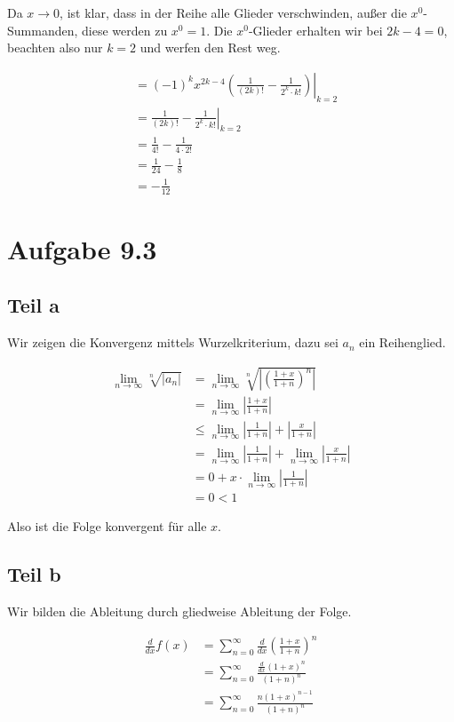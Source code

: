 \documentclass[a4paper,german,12pt,smallheadings]{scrartcl}
\begin{document}
Da $x \to 0$, ist klar, dass in der Reihe alle Glieder verschwinden, außer die
$x^0$-Summanden, diese werden zu $x^0 = 1$. Die $x^0$-Glieder erhalten wir bei
$2k-4 = 0$, beachten also nur $k=2$ und werfen den Rest weg.

\begin{align*}
   &= \left.(-1)^k x^{2k-4} \left(\frac{1}{(2k)!} - \frac{1}{2^k \cdot k!}\right)\right|_{k=2} \\
   &= \left.\frac{1}{(2k)!} - \frac{1}{2^k \cdot k!}\right|_{k=2} \\
   &= \frac{1}{4!} - \frac{1}{4\cdot 2!} \\
   &= \frac{1}{24} - \frac{1}{8} \\
   &= -\frac{1}{12}
\end{align*}

\section*{Aufgabe 9.3}
\subsection*{Teil a}

Wir zeigen die Konvergenz mittels Wurzelkriterium, dazu sei $a_n$ ein
Reihenglied.

\begin{align*}
  \lim_{n \to \infty} \sqrt[n]{|a_n|} &= \lim_{n \to \infty} \sqrt[n]{\left|\left(\frac{1+x}{1+n}\right)^n\right|} \\
  &= \lim_{n \to \infty} \left|\frac{1+x}{1+n}\right| \\
  &\le \lim_{n \to \infty} \left|\frac{1}{1+n}\right| + \left|\frac{x}{1+n}\right|\\
  &= \lim_{n \to \infty} \left|\frac{1}{1+n}\right| + \lim_{n \to \infty} \left|\frac{x}{1+n}\right|\\
  &= 0 + x \cdot \lim_{n \to \infty} \left|\frac{1}{1+n}\right|\\
  &= 0 < 1
\end{align*}

Also ist die Folge konvergent für alle $x$.

\subsection*{Teil b}
Wir bilden die Ableitung durch gliedweise Ableitung der Folge.

\begin{align*}
  \frac{d}{dx} f(x) &= \sum_{n=0}^\infty \frac{d}{dx} \left(\frac{1+x}{1+n}\right)^n \\
  &= \sum_{n=0}^\infty \frac{\frac{d}{dx} (1+x)^n}{(1+n)^n} \\
  &= \sum_{n=0}^\infty \frac{n (1+x)^{n-1}}{(1+n)^n}
\end{align*}
\end{document}
